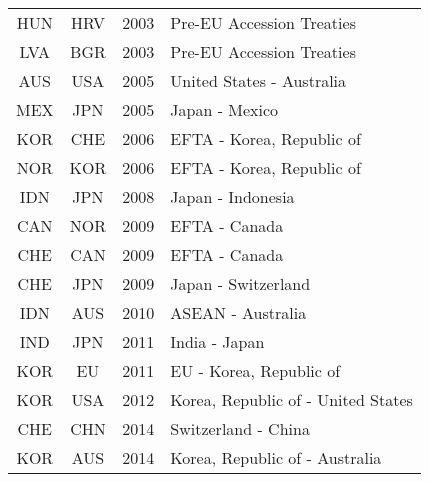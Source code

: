\documentclass[a4paper,12pt]{article}
\begin{document}
\begin{appendix}
\begin{table}[htp!]
{\begin{tabular}{c c c l}
HUN	&HRV	&2003	&Pre-EU Accession Treaties\\
LVA	&BGR	&2003	&Pre-EU Accession Treaties\\
AUS	&USA	&2005	&United States - Australia\\
MEX	&JPN	&2005	&Japan - Mexico\\
KOR	&CHE	&2006	&EFTA - Korea, Republic of\\
NOR	&KOR	&2006	&EFTA - Korea, Republic of\\
IDN	&JPN	&2008	&Japan - Indonesia\\
CAN	&NOR	&2009	&EFTA - Canada\\
CHE	&CAN	&2009	&EFTA - Canada\\
CHE	&JPN	&2009	&Japan - Switzerland\\
IDN	&AUS	&2010	&ASEAN - Australia\\
IND	&JPN	&2011	&India - Japan\\
KOR	&EU		&2011	&EU - Korea, Republic of\\
KOR	&USA	&2012	&Korea, Republic of - United States\\
CHE	&CHN	&2014	&Switzerland - China\\
KOR	&AUS	&2014	&Korea, Republic of - Australia\\
\bottomrule
\end {tabular}
\label{rta_table}
}
\end{table}


\end{appendix}
\end{document}
